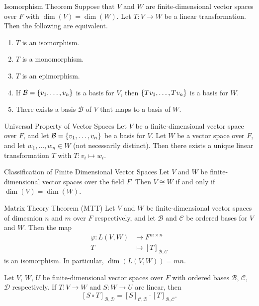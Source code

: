 \documentclass[class=article, crop=false]{standalone}
\begin{document}
  \begin{theorem}{Isomorphism Theorem}
    Suppose that $V$ and $W$ are finite-dimensional vector spaces over $F$ with $\dim(V) = \dim(W)$. Let $T\colon V\to W$ be a linear transformation. Then the following are equivalent.
    \begin{enumerate}[label=(\alph*)]
      \item $T$ is an isomorphism.
      \item $T$ is a monomorphism.
      \item $T$ is an epimorphism.
      \item If $\mathcal{B} = \left\{v_1, \dotsc, v_n\right\}$ is a basis for $V$, then $\left\{Tv_1, \dotsc,Tv_n\right\}$ is a basis for $W$.
      \item There exists a basis $\mathcal{B}$ of $V$ that maps to a basis of $W$.
    \end{enumerate}
  \end{theorem}
  \begin{theorem}{Universal Property of Vector Spaces}
    Let $V$ be a finite-dimensional vector space over $F$, and let $\mathcal{B} = \left\{v_1, \dotsc,v_n\right\}$ be a basis for $V$. Let $W$ be a vector space over $F$, and let $w_1,\dotsc,w_n\in W$ (not necessarily distinct). Then there exists a unique linear transformation $T$ with $T\colon v_i\mapsto w_i$.
  \end{theorem}
  \begin{theorem}{Classification of Finite Dimensional Vector Spaces}
    Let $V$ and $W$ be finite-dimensional vector spaces over the field $F$. Then $V\cong W$ if and only if $\dim(V) = \dim(W)$.
  \end{theorem}
  \begin{theorem}{Matrix Theory Theorem (MTT)}
    Let $V$ and $W$ be finite-dimensional vector spaces of dimesnion $n$ and $m$ over $F$ respectively, and let $\mathcal{B}$ and $\mathcal{C}$ be ordered bases for $V$ and $W$. Then the map
    \begin{align*}
      \varphi\colon L(V, W)&\to F^{m\times n} \\
      T &\mapsto [T]_{\mathcal{B},\mathcal{C}}
    \end{align*}
    is an isomorphism. In particular, $\dim(L(V,W)) = mn$.
  \end{theorem}
  \begin{theorem}{12.2}
    Let $V$, $W$, $U$ be finite-dimensional vector spaces over $F$ with ordered bases $\mathcal{B}$, $\mathcal{C}$, $\mathcal{D}$ respectively. If $T\colon V\to W$ and $S\colon W\to U$ are linear, then
    \[
      [S\circ T]_{\mathcal{B}, \mathcal{D}} = [S]_{\mathcal{C},\mathcal{D}}\cdot [T]_{\mathcal{B},\mathcal{C}}.
    \]
  \end{theorem}
\end{document}
